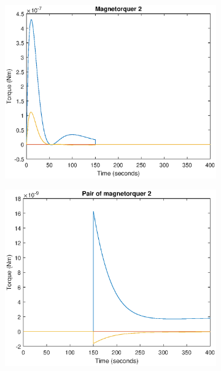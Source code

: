 \begin{figure}[H]
\begin{subfigure}{0.5\linewidth}
	\centering
	\includegraphics[width=1\linewidth]{figures/config2.eps}
	\label{fig:fig:magcompens3}
\end{subfigure}
\begin{subfigure}{0.5\linewidth}
	\centering
	\includegraphics[width=1\linewidth]{figures/config22.eps}
	\label{fig:fig:magcompens4}	
	\caption{}
\end{subfigure}
\begin{subfigure}{0.5\linewidth}
	\centering

\end{subfigure}
\end{figure}
